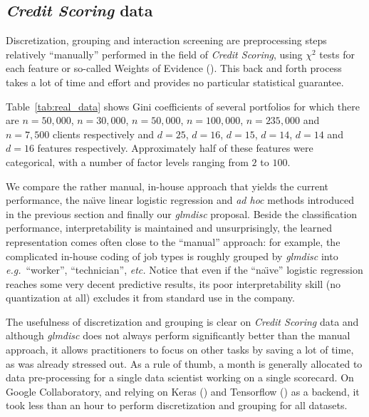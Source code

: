 \subsection{\textit{Credit Scoring} data}


Discretization, grouping and interaction screening are preprocessing steps relatively ``manually'' performed in the field of \textit{Credit Scoring}, using $\chi^2$ tests for each feature or so-called Weights of Evidence (\cite{zeng2014necessary}). This back and forth process takes a lot of time and effort and provides no particular statistical guarantee.

Table~\ref{tab:real_data} shows Gini coefficients of several portfolios for which there are $n=50,000$, $n=30,000$, $n=50,000$, $n=100,000$, $n=235,000$ and $n=7,500$ clients respectively and $d=25$, $d=16$, $d=15$, $d=14$, $d=14$ and $d=16$ features respectively. Approximately half of these features were categorical, with a number of factor levels ranging from $2$ to $100$. 

We compare the rather manual, in-house approach that yields the current performance, the na\"{\i}ve linear logistic regression and \textit{ad hoc} methods introduced in the previous section and finally our \textit{glmdisc} proposal. Beside the classification performance, interpretability is maintained and unsurprisingly, the learned representation comes often close to the ``manual'' approach: for example, the complicated in-house coding of job types is roughly grouped by \textit{glmdisc} into \textit{e.g.}\ ``worker'', ``technician'', \textit{etc.} Notice that even if the ``na\"{\i}ve'' logistic regression reaches some very decent predictive results, its poor interpretability skill (no quantization at all) excludes it from standard use in the company.

The usefulness of discretization and grouping is clear on \textit{Credit Scoring} data and although \textit{glmdisc} does not always perform significantly better than the manual approach, it allows practitioners to focus on other tasks by saving a lot of time, as was already stressed out. As a rule of thumb, a month is generally allocated to data pre-processing for a single data scientist working on a single scorecard. On Google Collaboratory, and relying on Keras (\cite{chollet2015keras}) and Tensorflow (\cite{tensorflow2015-whitepaper}) as a backend, it took less than an hour to perform discretization and grouping for all datasets.




